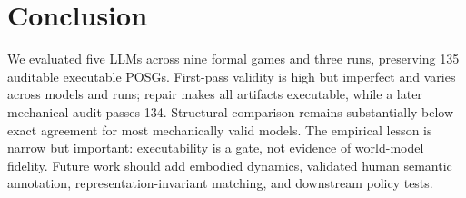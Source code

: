 \documentclass{article}
\begin{document}
\section{Conclusion}
We evaluated five LLMs across nine formal games and three runs, preserving 135
auditable executable POSGs. First-pass validity is high but imperfect and
varies across models and runs; repair makes all artifacts executable, while a
later mechanical audit passes 134. Structural comparison remains substantially
below exact agreement for most mechanically valid models. The empirical lesson
is narrow but important: executability is a gate, not evidence of world-model
fidelity. Future work should add embodied dynamics, validated human semantic
annotation, representation-invariant matching, and downstream policy tests.
\end{document}
